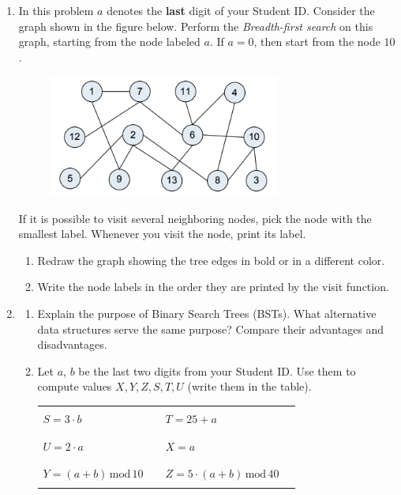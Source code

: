 \documentclass[a4paper,12pt]{article}
\begin{document}
\begin{enumerate}
\newpage

\item In this problem $a$ denotes the {\bf last} digit 
of your Student ID. 
Consider the graph shown in the figure below. 
Perform the {\em Breadth-first search} on this graph, 
starting from the node labeled $a$. 
If $a = 0$, then start from the node $10$. 

\begin{figure}[!htb]
\centering
\includegraphics[width=3in]{undirected-graph.png}
\end{figure}


If it is possible to visit several neighboring nodes, 
pick the node with the smallest label. 
Whenever you visit the node, print its label. 

\begin{enumerate}
\item Redraw the graph showing the tree edges in bold or in 
a different color. 


\item Write the node labels
in the order they are printed by the visit function.  
\end{enumerate}

\newpage

\item 

\begin{enumerate}
\item Explain the purpose of Binary Search Trees (BSTs). What alternative data
structures serve the same purpose? Compare their advantages and disadvantages.


\item Let $a$, $b$ be the last two digits from your Student ID. Use them to compute values
$X, Y, Z, S, T, U$ (write them in the table). 

\vspace{2ex}

\begin{tabular}{ll|ll}
$S = 3 \cdot b$ & \rule{3cm}{0.4pt} & $T = 25+a$ & \rule{3cm}{0.4pt} \\[2ex]
$U = 2 \cdot a$ & \rule{3cm}{0.4pt} & $X = a$  & \rule{3cm}{0.4pt} \\[2ex]
$Y = (a+b)\,\text{mod}\,10$ & \rule{3cm}{0.4pt} & $Z = 5 \cdot (a+b)\,\text{mod}\,40$ & \rule{3cm}{0.4pt} \\[2ex]
\end{tabular}



\end{enumerate}
\end{enumerate}
\end{document}
